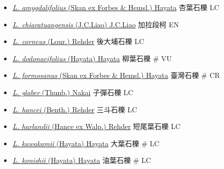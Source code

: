 \begin{itemize}
  \begin{itemize}
        \item[] \href{http://www.theplantlist.org/tpl1.1/search?q=Lithocarpus+amygdalifolius}{\textit{L. amygdalifolius} (Skan ex Forbes \& Hemsl.) Hayata}   杏葉石櫟   LC
        \item[] \href{http://www.theplantlist.org/tpl1.1/search?q=Lithocarpus+chiaratuangensis}{\textit{L. chiaratuangensis} (J.C.Liao) J.C.Liao}   加拉段柯   EN
        \item[] \href{http://www.theplantlist.org/tpl1.1/search?q=Lithocarpus+corneus}{\textit{L. corneus} (Lour.) Rehder}   後大埔石櫟   LC
        \item[] \href{http://www.theplantlist.org/tpl1.1/search?q=Lithocarpus+dodonaeifolius}{\textit{L. dodonaeifolius} (Hayata) Hayata}   柳葉石櫟  \# VU
        \item[] \href{http://www.theplantlist.org/tpl1.1/search?q=Lithocarpus+formosanus}{\textit{L. formosanus} (Skan ex Forbes \& Hemsl.) Hayata}   臺灣石櫟  \# CR
        \item[] \href{http://www.theplantlist.org/tpl1.1/search?q=Lithocarpus+glaber}{\textit{L. glaber} (Thunb.) Nakai}   子彈石櫟   LC
        \item[] \href{http://www.theplantlist.org/tpl1.1/search?q=Lithocarpus+hancei}{\textit{L. hancei} (Benth.) Rehder}   三斗石櫟   LC
        \item[] \href{http://www.theplantlist.org/tpl1.1/search?q=Lithocarpus+harlandii}{\textit{L. harlandii} (Hance ex Walp.) Rehder}   短尾葉石櫟   LC
        \item[] \href{http://www.theplantlist.org/tpl1.1/search?q=Lithocarpus+kawakamii}{\textit{L. kawakamii} (Hayata) Hayata}   大葉石櫟  \# LC
        \item[] \href{http://www.theplantlist.org/tpl1.1/search?q=Lithocarpus+konishii}{\textit{L. konishii} (Hayata) Hayata}   油葉石櫟  \# LC

\end{itemize}
\end{itemize}
